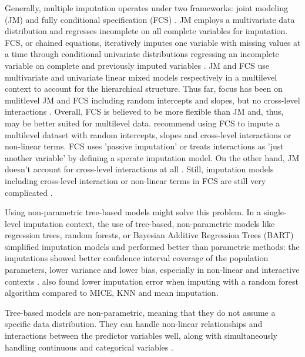 \documentclass[10pt, a4paper, titlepage]{article}
\begin{document}
Generally, multiple imputation operates under two frameworks: joint modeling (JM) and fully conditional specification (FCS) \citep{mistlerComparisonJointModel2017, buurenFlexibleImputationMissing2018, enders2018, enders2018a, hughes2014}. JM employs a multivariate data distribution and regresses incomplete on all complete variables for imputation. FCS, or chained equations, iteratively imputes one variable with missing values at a time through conditional univariate distributions regressing an incomplete variable on complete and previously imputed variables \citep{mistlerComparisonJointModel2017, buurenFlexibleImputationMissing2018, enders2016, enders2018, enders2018a, hughes2014, grund2018a}. JM and FCS use multivariate and univariate linear mixed models respectively in a multilevel context \citep{mistlerComparisonJointModel2017, enders2018, resche-rigon2018} to account for the hierarchical structure. Thus far, focus has been on mulitlevel JM and FCS including random intercepts and slopes, but no cross-level interactions \cite{grund2018a, grund2016, enders2018, enders2018a, enders2020, enders2016}. Overall, FCS is believed to be more flexible than JM \citep{audigier2018, burgette2010, vanbuuren2007, grund2018a} and, thus, may be better suited for multilevel data. \citet{grund2018} recommend using FCS to impute a multilevel dataset with random intercepts, slopes and cross-level interactions or non-linear terms. FCS uses 'passive imputation' or treats interactions as 'just another variable' by defining a sperate imputation model. On the other hand, JM doesn't account for cross-level interactions at all \citep{buurenFlexibleImputationMissing2018, grund2018}. Still, imputation models including cross-level interaction or non-linear terms in FCS are still very complicated \citep{grund2021, grund2018}.

Using non-parametric tree-based models might solve this problem. In a single-level imputation context, the use of tree-based, non-parametric models like regression trees, random forests, or Bayesian Additive Regression Trees (BART) simplified imputation models and performed better than parametric methods: the imputations showed better confidence interval coverage of the population parameters, lower variance and lower bias, especially in non-linear and interactive contexts \citep{burgette2010, xu2016, silva2022}. \citet{waljee2013} also found lower imputation error when imputing with a random forest algorithm compared to MICE, KNN and mean imputation.

Tree-based models are non-parametric, meaning that they do not assume a specific data distribution. They can handle non-linear relationships and interactions between the predictor variables well, along with simultaneously handling continuous and categorical variables \citep{hill2020, burgette2010, lin2019, chipman2010, james2021, salditt2023, breiman1984}.
\end{document}
